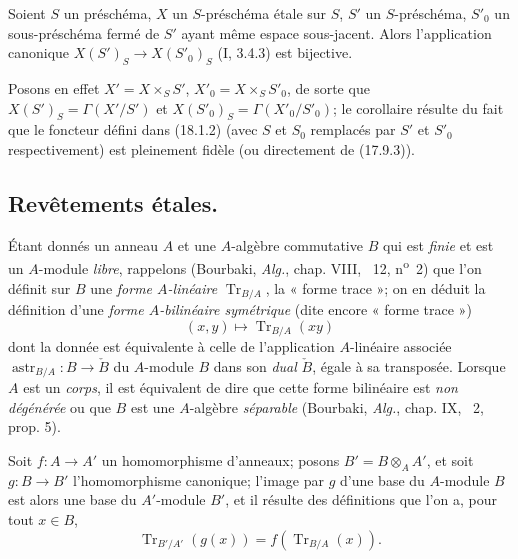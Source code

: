 \begin{corollary}[18.1.3]
\label{IV.18.1.3}
Soient $S$ un préschéma, $X$ un $S$-préschéma étale sur $S$, $S'$ un $S$-préschéma, $S'_0$ un sous-préschéma fermé de $S'$ ayant même espace sous-jacent. Alors l'application canonique $X(S')_S\to X(S'_0)_S$ (I, 3.4.3) est bijective.
\end{corollary}

Posons en effet $X'=X\times_S S'$, $X'_0=X\times_S S'_0$, de sorte que $X(S')_S=\Gamma(X'/S')$ et $X(S'_0)_S=\Gamma(X'_0/S'_0)$; le corollaire résulte du fait que le foncteur défini dans (18.1.2) (avec $S$ et $S_0$ remplacés par $S'$ et $S'_0$ respectivement) est pleinement fidèle (ou directement de (17.9.3)).

\subsection{Revêtements étales.}
\label{subsection:IV.18.2}


\begin{env}[18.2.1]
\label{IV.18.2.1}
Étant donnés un anneau $A$ et une $A$-algèbre commutative $B$ qui est \emph{finie} et est un $A$-module \emph{libre}, rappelons (Bourbaki, \emph{Alg.}, chap. VIII, \textsection~12, n\textsuperscript{o}~2) que l'on définit sur $B$ une \emph{forme $A$-linéaire} $\operatorname{Tr}_{B/A}$, la « forme trace »; on en déduit la définition d'une \emph{forme $A$-bilinéaire symétrique} (dite encore « forme trace »)
\begin{equation}
  (x,y)\longmapsto\operatorname{Tr}_{B/A}(xy)
  \tag{18.2.1.1}\label{IV.18.2.1.1}
\end{equation}
dont la donnée est équivalente à celle de l'application $A$-linéaire associée $\operatorname{astr}_{B/A}:B\to\check B$ du $A$-module $B$ dans son \emph{dual} $\check B$, égale à sa transposée. Lorsque $A$ est un \emph{corps}, il est équivalent de dire que cette forme bilinéaire est \emph{non dégénérée} ou que $B$ est une $A$-algèbre \emph{séparable} (Bourbaki, \emph{Alg.}, chap. IX, \textsection~2, prop. 5).

Soit $f:A\to A'$ un homomorphisme d'anneaux; posons $B'=B\otimes_A A'$, et soit $g:B\to B'$ l'homomorphisme canonique; l'image par $g$ d'une base du $A$-module $B$ est alors une base du $A'$-module $B'$, et il résulte des définitions que l'on a, pour tout $x\in B$,
\begin{equation}
  \operatorname{Tr}_{B'/A'}(g(x))=f(\operatorname{Tr}_{B/A}(x)).
  \tag{18.2.1.2}\label{IV.18.2.1.2}
\end{equation}
\end{env}

